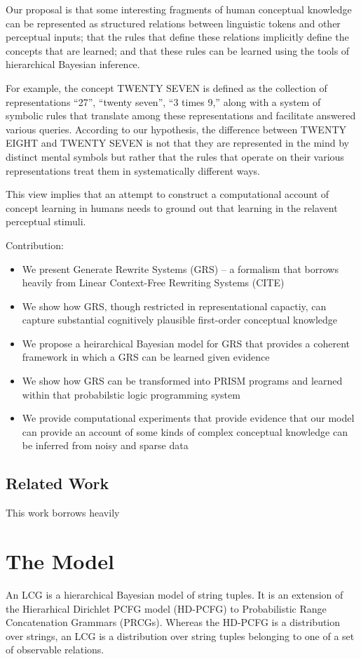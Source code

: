 \documentclass{article}
\begin{document}
Our proposal is that some interesting fragments of human conceptual
knowledge can be represented as structured relations between
linguistic tokens and other perceptual inputs; that the rules that
define these relations implicitly define the concepts that are
learned; and that these rules can be learned using the tools of
hierarchical Bayesian inference. 

For example, the concept TWENTY SEVEN is defined as the collection of
representations ``27'', ``twenty seven'', ``3 times 9,'' along with a
system of symbolic rules that translate among these representations
and facilitate answered various queries. According to our hypothesis,
the difference between TWENTY EIGHT and TWENTY SEVEN is not that they
are represented in the mind by distinct mental symbols but rather that
the rules that operate on their various representations treat them in
systematically different ways.

This view implies that an attempt to construct a computational account
of concept learning in humans needs to ground out that learning in the
relavent perceptual stimuli. 

Contribution:
\begin{itemize}
\item We present Generate Rewrite Systems (GRS) -- a formalism that borrows
  heavily from Linear Context-Free Rewriting Systems (CITE)
\item We show how GRS, though restricted in representational capactiy,
  can capture substantial cognitively plausible first-order conceptual knowledge 
\item We propose a heirarchical Bayesian model for GRS that provides a coherent framework in which a GRS can be learned given evidence
\item We show how GRS can be transformed into PRISM programs and learned within that probabilstic logic programming system
\item We provide computational experiments that provide evidence that
  our model can provide an account of some kinds of complex conceptual
  knowledge can be inferred from noisy and sparse data
\end{itemize}

\subsection{Related Work}
This work borrows heavily 

\section{The Model}
An LCG is a hierarchical Bayesian model of string tuples. It is an
extension of the Hierarhical Dirichlet PCFG model (HD-PCFG) to
Probabilistic Range Concatenation Grammars (PRCGs). Whereas the
HD-PCFG is a distribution over strings, an LCG is a distribution over
string tuples belonging to one of a set of observable
relations. 
\end{document}
